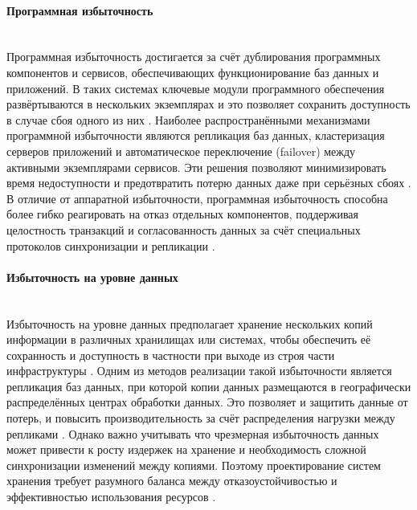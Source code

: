 \paragraph{Программная избыточность} ~\\
Программная избыточность достигается за счёт дублирования программных компонентов и сервисов, обеспечивающих функционирование баз данных и приложений. В таких системах ключевые модули программного обеспечения развёртываются в нескольких экземплярах и это позволяет сохранить доступность в случае сбоя одного из них \autocites{RajeshKumar}{SameerParadkar}.
Наиболее распространёнными механизмами программной избыточности являются репликация баз данных, кластеризация серверов приложений и автоматическое переключение (failover) между активными экземплярами сервисов. Эти решения позволяют минимизировать время недоступности и предотвратить потерю данных даже при серьёзных сбоях \autocite{OszuValduriez}.
В отличие от аппаратной избыточности, программная избыточность способна более гибко реагировать на отказ отдельных компонентов, поддерживая целостность транзакций и согласованность данных за счёт специальных протоколов синхронизации и репликации \autocite{Kleppmann}.

\paragraph{Избыточность на уровне данных} ~\\
Избыточность на уровне данных предполагает хранение нескольких копий информации в различных хранилищах или системах, чтобы обеспечить её сохранность и доступность в частности при выходе из строя части инфраструктуры \autocite{RajeshKumar}.
Одним из методов реализации такой избыточности является репликация баз данных, при которой копии данных размещаются в географически распределённых центрах обработки данных. Это позволяет и защитить данные от потерь, и повысить производительность за счёт распределения нагрузки между репликами \autocite{OszuValduriez}.
Однако важно учитывать что чрезмерная избыточность данных может привести к росту издержек на хранение и необходимость сложной синхронизации изменений между копиями. Поэтому проектирование систем хранения требует разумного баланса между отказоустойчивостью и эффективностью использования ресурсов \autocite{Kleppmann}.

